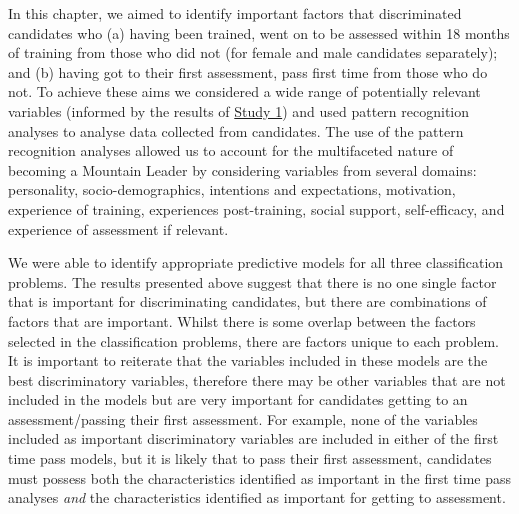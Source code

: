 \documentclass[
  12pt,
  a4paper,
]{book}
\begin{document}
In this chapter, we aimed to identify important factors that discriminated candidates who (a) having been trained, went on to be assessed within 18 months of training from those who did not (for female and male candidates separately); and (b) having got to their first assessment, pass first time from those who do not. To achieve these aims we considered a wide range of potentially relevant variables (informed by the results of \protect\hyperlink{ml-qualitative}{Study 1}) and used pattern recognition analyses to analyse data collected from candidates. The use of the pattern recognition analyses allowed us to account for the multifaceted nature of becoming a Mountain Leader by considering variables from several domains: personality, socio-demographics, intentions and expectations, motivation, experience of training, experiences post-training, social support, self-efficacy, and experience of assessment if relevant.

We were able to identify appropriate predictive models for all three classification problems. The results presented above suggest that there is no one single factor that is important for discriminating candidates, but there are combinations of factors that are important. Whilst there is some overlap between the factors selected in the classification problems, there are factors unique to each problem. It is important to reiterate that the variables included in these models are the best discriminatory variables, therefore there may be other variables that are not included in the models but are very important for candidates getting to an assessment/passing their first assessment. For example, none of the variables included as important discriminatory variables are included in either of the first time pass models, but it is likely that to pass their first assessment, candidates must possess both the characteristics identified as important in the first time pass analyses \emph{and} the characteristics identified as important for getting to assessment.
\end{document}

